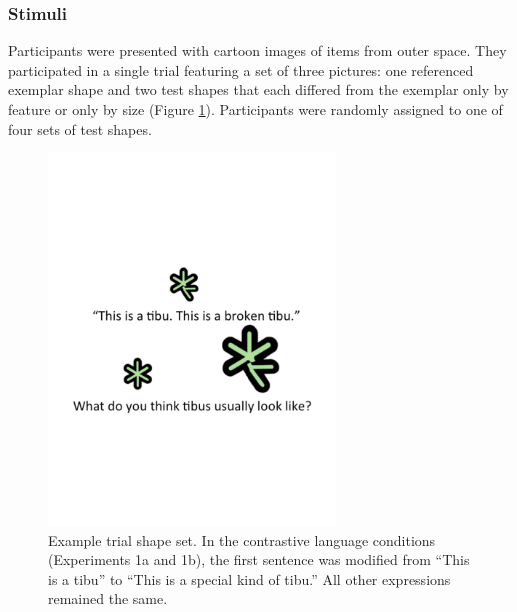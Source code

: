 \documentclass[10pt,letterpaper]{article}
\begin{document}
\subsubsection{Stimuli}

Participants were presented with cartoon images of items from outer space. They participated in a single trial featuring a set of three pictures: one referenced exemplar shape and two test shapes that each differed from the exemplar only by feature or only by size (Figure \ref{fig:demo}).  Participants were randomly assigned to one of four sets of test shapes.  


\begin{figure}[t] 
  \begin{center} 
    \includegraphics[width=3in]{figures/demo.pdf} 
    \caption{\label{fig:demo} Example trial shape set.  In the contrastive language conditions (Experiments 1a and 1b), the first sentence was modified from ``This is a tibu'' to ``This is a special kind of tibu.''  All other expressions remained the same. }
  \end{center} 
\end{figure}
	
\end{document}
